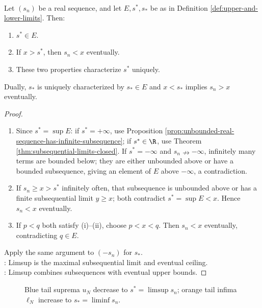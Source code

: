 \begin{theorem} \label{thm:limsup-characterization} \\
Let $(s_n)$ be a real sequence, and let $E,s^*,s_*$ be as in Definition \ref{def:upper-and-lower-limits}. Then:
\begin{enumerate}[label=(\roman*)]
\setlength{\itemsep}{0pt}
\item $s^*\in E$.
\item If $x>s^*$, then $s_n<x$ eventually.
\item These two properties characterize $s^*$ uniquely.
\end{enumerate}
Dually, $s_*$ is uniquely characterized by $s_*\in E$ and $x<s_*$ implies $s_n>x$ eventually.
\begin{proof}
\begin{enumerate}[label=(\roman*)]
\setlength{\itemsep}{0pt}
\item Since $s^*=\sup E$: if $s^*=+\infty$, use Proposition \ref{prop:unbounded-real-sequence-has-infinite-subsequence}; if $s^*\in\R$, use Theorem \ref{thm:subsequential-limits-closed}. If $s^*=-\infty$ and $s_n\nrightarrow-\infty$, infinitely many terms are bounded below; they are either unbounded above or have a bounded subsequence, giving an element of $E$ above $-\infty$, a contradiction.
\item If $s_n\geq x>s^*$ infinitely often, that subsequence is unbounded above or has a finite subsequential limit $y\geq x$; both contradict $s^*=\sup E<x$. Hence $s_n<x$ eventually.
\item If $p<q$ both satisfy (i)--(ii), choose $p<x<q$. Then $s_n<x$ eventually, contradicting $q\in E$.
\end{enumerate}
Apply the same argument to $(-s_n)$ for $s_*$.\\
: Limsup is the maximal subsequential limit and eventual ceiling.\\
: Limsup combines subsequences with eventual upper bounds.
\end{proof}
\end{theorem}

\begin{figure}[H]
  \centering
  
  \caption{Blue tail suprema $u_N$ decrease to $s^*=\limsup s_n$; orange tail infima $\ell_N$ increase to $s_*=\liminf s_n$.}
  \label{fig:limsup-liminf-tail-bounds}
\end{figure}

